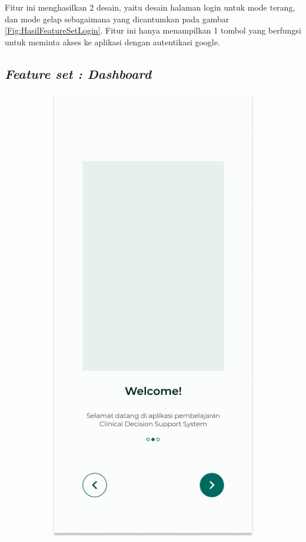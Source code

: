Fitur ini menghasilkan 2 desain, yaitu desain halaman login untuk mode terang, dan mode gelap sebagaimana yang dicantumkan pada gambar \ref*{Fig:HasilFeatureSetLogin}.
Fitur ini hanya menampilkan 1 tombol yang berfungsi untuk meminta akses ke aplikasi dengan autentikasi google.
\subsection{\textit{Feature set : Dashboard}}
\begin{figure}[H]
	\centering
	\begin{subfigure}[b]{0.23\textwidth}
		\centering
	  \includegraphics[width=\linewidth]{contents/chapter-3/images/HF-Boarding.png}

\end{subfigure}
\end{figure}
